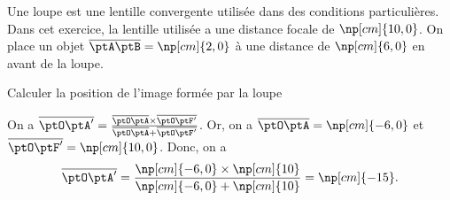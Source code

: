 
\finEntrainement







\hauteurLargeurCadreReponse		{8mm}{5cm}
\typeEntrainement				{} %
\initialisationEntrainement

Une loupe est une lentille convergente utilisée dans des conditions particulières. Dans cet exercice, la lentille utilisée a une distance focale de $\np[cm]{10,0}$. On place un objet $\overline{\ptA\ptB}=\np[cm]{2,0}$ à une distance de $\np[cm]{6,0}$ en avant de la loupe. 

\debutEntrainement


\begin{enonce}
Calculer la position de l'image formée par la loupe
\end{enonce}


\begin{corrige}
On a  $\overline{\ptO\ptA'}=\frac{\overline{\ptO\ptA}\times\overline{\ptO\ptF'}}{\overline{\ptO\ptA}+\overline{\ptO\ptF'}}$. Or, on a  $\overline{\ptO\ptA}=\np[cm]{-6,0}$ et $\overline{\ptO\ptF'}=\np[cm]{10,0}$. Donc, on a 
\[
\overline{\ptO\ptA'}=\frac{\np[cm]{-6,0}\times\np[cm]{10}}{\np[cm]{-6,0}+\np[cm]{10}}=\np[cm]{-15}.
\]
\end{corrige}

